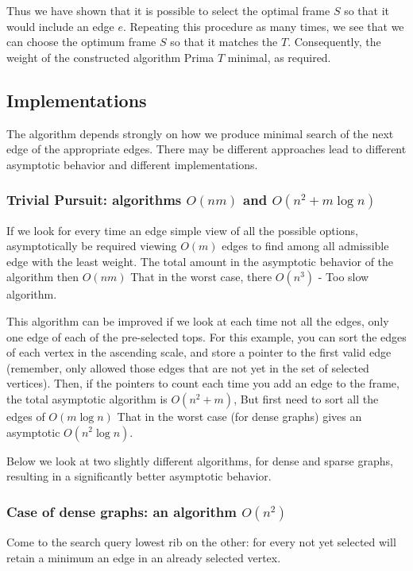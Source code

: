 Thus we have shown that it is possible to select the optimal frame $S$ so that it would include an edge $e$. Repeating this procedure as many times, we see that we can choose the optimum frame $S$ so that it matches the $T$. Consequently, the weight of the constructed algorithm Prima $T$ minimal, as required.

\subsection{ Implementations }

The algorithm depends strongly on how we produce minimal search of the next edge of the appropriate edges. There may be different approaches lead to different asymptotic behavior and different implementations.

\subsubsection{ Trivial Pursuit: algorithms $O (n m)$ and $O (n ^ 2 + m \log n)$}

If we look for every time an edge simple view of all the possible options, asymptotically be required viewing $O (m)$ edges to find among all admissible edge with the least weight. The total amount in the asymptotic behavior of the algorithm then $O (nm)$ That in the worst case, there $O (n ^ 3)$ - Too slow algorithm.

This algorithm can be improved if we look at each time not all the edges, only one edge of each of the pre-selected tops. For this example, you can sort the edges of each vertex in the ascending scale, and store a pointer to the first valid edge (remember, only allowed those edges that are not yet in the set of selected vertices). Then, if the pointers to count each time you add an edge to the frame, the total asymptotic algorithm is $O (n ^ 2 + m)$, But first need to sort all the edges of $O (m \log n)$ That in the worst case (for dense graphs) gives an asymptotic $O (n ^ 2 \log n)$.

Below we look at two slightly different algorithms, for dense and sparse graphs, resulting in a significantly better asymptotic behavior.

\subsubsection{ Case of dense graphs: an algorithm $O (n ^ 2)$}

Come to the search query lowest rib on the other: for every not yet selected will retain a minimum an edge in an already selected vertex.

